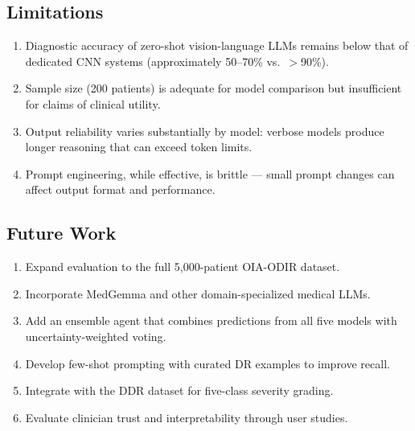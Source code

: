 \documentclass[11pt,a4paper]{article}
\begin{document}
\subsection*{Limitations}

\begin{enumerate}
    \item Diagnostic accuracy of zero-shot vision-language LLMs remains below that of dedicated CNN systems (approximately 50--70\% vs.\ $>$90\%).
    \item Sample size (200 patients) is adequate for model comparison but insufficient for claims of clinical utility.
    \item Output reliability varies substantially by model: verbose models produce longer reasoning that can exceed token limits.
    \item Prompt engineering, while effective, is brittle --- small prompt changes can affect output format and performance.
\end{enumerate}

\subsection*{Future Work}

\begin{enumerate}
    \item Expand evaluation to the full 5,000-patient OIA-ODIR dataset.
    \item Incorporate MedGemma and other domain-specialized medical LLMs.
    \item Add an ensemble agent that combines predictions from all five models with uncertainty-weighted voting.
    \item Develop few-shot prompting with curated DR examples to improve recall.
    \item Integrate with the DDR dataset for five-class severity grading.
    \item Evaluate clinician trust and interpretability through user studies.
\end{enumerate}
\end{document}

